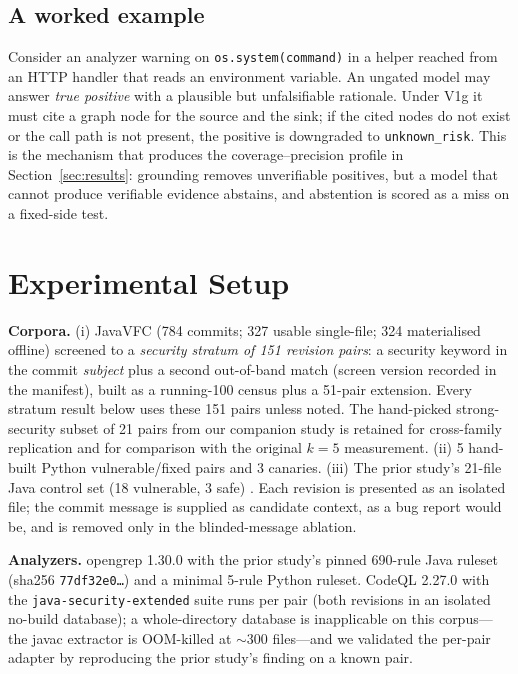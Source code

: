 \documentclass[conference]{IEEEtran}
\newcommand{\code}[1]{\texttt{#1}}
\begin{document}
\subsection{A worked example}
Consider an analyzer warning on \code{os.system(command)} in a helper reached from an
HTTP handler that reads an environment variable. An ungated model may answer
\emph{true positive} with a plausible but unfalsifiable rationale. Under V1g it must
cite a graph node for the source and the sink; if the cited nodes do not exist or
the call path is not present, the positive is downgraded to \code{unknown\_risk}.
This is the mechanism that produces the coverage--precision profile in
Section~\ref{sec:results}: grounding removes unverifiable positives, but a model
that cannot produce verifiable evidence abstains, and abstention is scored as a
miss on a fixed-side test.

\section{Experimental Setup}
\label{sec:setup}
\textbf{Corpora.} (i) JavaVFC \cite{javavfc} (784 commits; 327 usable
single-file; 324 materialised offline) screened to a \emph{security stratum of
151 revision pairs}: a security keyword in the commit \emph{subject} plus a
second out-of-band match (screen version recorded in the manifest), built as a
running-100 census plus a 51-pair extension. Every stratum result below uses
these 151 pairs unless noted. The hand-picked strong-security subset of 21 pairs
from our companion study \cite{sastaudit} is retained for cross-family
replication and for comparison with the original $k{=}5$ measurement. (ii) 5
hand-built Python vulnerable/fixed pairs and 3 canaries. (iii) The prior study's
21-file Java control set (18 vulnerable, 3 safe) \cite{sastaudit}. Each revision
is presented as an isolated file; the commit message is supplied as candidate
context, as a bug report would be, and is removed only in the blinded-message
ablation.

\textbf{Analyzers.} opengrep 1.30.0 with the prior study's pinned 690-rule Java
ruleset (sha256 \code{77df32e0\dots}) and a minimal 5-rule Python ruleset.
CodeQL 2.27.0 with the \code{java-security-extended} suite runs per pair (both
revisions in an isolated no-build database); a whole-directory database is
inapplicable on this corpus---the javac extractor is OOM-killed at ${\sim}300$
files---and we validated the per-pair adapter by reproducing the prior study's
finding on a known pair.
\end{document}
